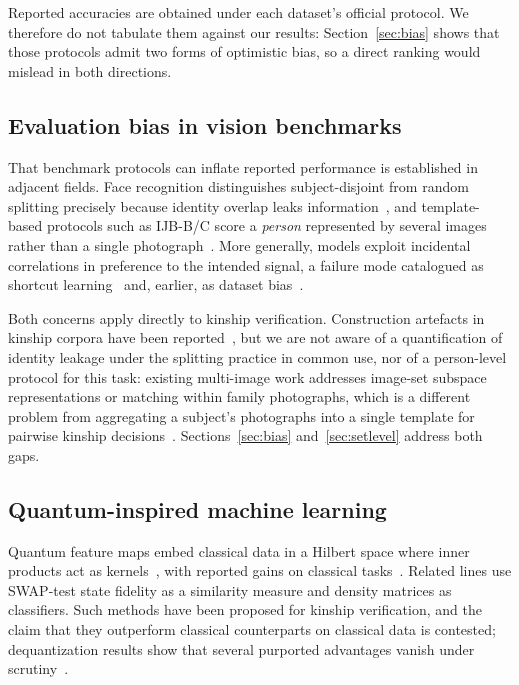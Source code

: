 \documentclass[preprint,12pt]{elsarticle}
\begin{document}
Reported accuracies are obtained under each dataset's official protocol. We
therefore do not tabulate them against our results: Section~\ref{sec:bias}
shows that those protocols admit two forms of optimistic bias, so a direct
ranking would mislead in both directions.

\subsection{Evaluation bias in vision benchmarks}

That benchmark protocols can inflate reported performance is established in
adjacent fields. Face recognition distinguishes subject-disjoint from random
splitting precisely because identity overlap leaks
information~\cite{kemelmacher2016megaface}, and template-based protocols such as
IJB-B/C score a \emph{person} represented by several images rather than a
single photograph~\cite{whitelam2017ijbb}. More generally, models exploit
incidental correlations in preference to the intended signal, a failure mode
catalogued as shortcut learning~\cite{geirhos2020shortcut} and, earlier, as
dataset bias~\cite{torralba2011unbiased}.

Both concerns apply directly to kinship verification. Construction artefacts in
kinship corpora have been reported~\cite{dawson2018samephoto}, but we are not aware
of a quantification of identity leakage under the splitting practice in common
use, nor of a person-level protocol for this task: existing multi-image work
addresses image-set subspace representations or matching within family
photographs, which is a different problem from aggregating a subject's
photographs into a single template for pairwise kinship
decisions~\cite{kohli2019imageset}. Sections~\ref{sec:bias}
and~\ref{sec:setlevel} address both gaps.

\subsection{Quantum-inspired machine learning}

Quantum feature maps embed classical data in a Hilbert space where inner
products act as kernels~\cite{schuld2019quantum}, with reported gains on
classical tasks~\cite{havlicek2019supervised}. Related lines use SWAP-test
state fidelity as a similarity measure and density matrices as classifiers.
Such methods have been proposed for kinship verification, and the claim that
they outperform classical counterparts on classical data is contested;
dequantization results show that several purported advantages
vanish under scrutiny~\cite{tang2019quantum}.
\end{document}
